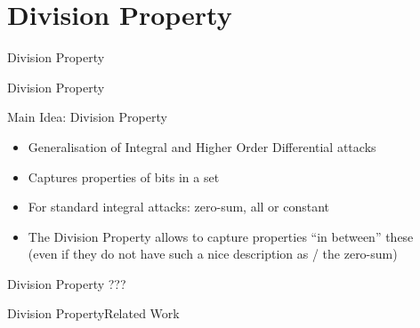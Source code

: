 \section{Division Property}
\begin{frame}
    \centering
    \Huge
    Division Property
    \vfill
\end{frame}

\begin{frame}{Division Property}
    \begin{block}{Main Idea: Division Property}
        \begin{itemize}
            \item Generalisation of Integral and Higher Order Differential attacks
            \item Captures properties of bits in a set
            \item For standard integral attacks: zero-sum, all or constant
            \item The Division Property allows to capture properties \enquote{in between} these\\
                  (even if they do not have such a nice description as \eg/ the zero-sum)
        \end{itemize}
    \end{block}
    \begin{block}{Division Property}
        ???
    \end{block}
\end{frame}

\begin{frame}{Division Property}{Related Work}
    \begin{timeline}
    \end{timeline}
\end{frame}

